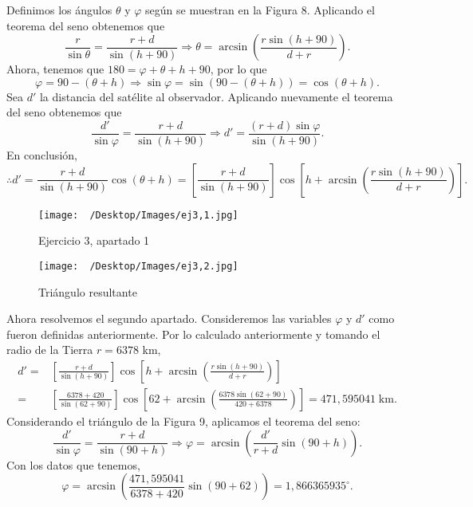 \documentclass{article}
\begin{document}
\begin{sol}
	Definimos los ángulos $\displaystyle \theta $ y $\displaystyle \varphi $ según se muestran en la Figura 8. Aplicando el teorema del seno obtenemos que
\[ \frac{r}{\sin \theta } = \frac{r + d}{\sin\left(h + 90\right)} \Rightarrow \theta = \arcsin\left(\frac{r\sin\left(h+90\right)}{d + r}\right) .\]
Ahora, tenemos que $\displaystyle 180 = \varphi + \theta + h + 90 $, por lo que
\[\varphi = 90 - \left(\theta + h\right) \Rightarrow \sin\varphi = \sin\left(90-\left(\theta + h\right)\right) = \cos \left(\theta + h\right) .\]
Sea $\displaystyle d' $ la distancia del satélite al observador. Aplicando nuevamente el teorema del seno obtenemos que
\[ \frac{d'}{\sin\varphi} = \frac{r + d}{\sin\left(h+90\right)} \Rightarrow d' = \frac{\left(r+d\right)\sin\varphi}{\sin\left(h+90\right)} .\]
En conclusión,
\[\therefore d' = \frac{r+d}{\sin\left(h+90\right)}\cos\left(\theta + h\right) = \left[\frac{r + d}{\sin\left(h+90\right)}\right] \cos\left[h + \arcsin\left(\frac{r \sin\left(h+90\right)}{d + r}\right)\right] .\]
\begin{figure}
	\centering
	\texttt{[image: ~/Desktop/Images/ej3,1.jpg]}
	\caption{Ejercicio 3, apartado 1}
	\label{}
	\end{figure}
	\begin{figure}
	\centering
	\texttt{[image: ~/Desktop/Images/ej3,2.jpg]}
	\caption{Triángulo resultante}
	\label{}
	\end{figure}
Ahora resolvemos el segundo apartado. Consideremos las variables $\displaystyle \varphi $ y $\displaystyle d' $ como fueron definidas anteriormente. Por lo calculado anteriormente y tomando el radio de la Tierra $\displaystyle r = 6378 $ km,
\[
\begin{split}
	d' = & \left[\frac{r + d}{\sin\left(h+90\right)}\right] \cos\left[h + \arcsin\left(\frac{r \sin\left(h+90\right)}{d + r}\right)\right] \\
	= & \left[\frac{6378 + 420}{\sin\left(62 + 90\right)}\right] \cos\left[62+ \arcsin\left(\frac{6378 \sin\left(62 + 90\right)}{420 + 6378}\right)\right] = 471,595041 \; \text{km} .
\end{split}
\]
Considerando el triángulo de la Figura 9, aplicamos el teorema del seno:
\[ \frac{d'}{\sin\varphi} = \frac{r + d}{\sin\left(90 + h\right)} \Rightarrow \varphi = \arcsin\left(\frac{d'}{r + d}\sin\left(90+h\right)\right) .\]
Con los datos que tenemos,
\[\varphi = \arcsin\left(\frac{471,595041}{6378 + 420}\sin\left(90+62\right)\right) = 1,866365935^{\circ}.\]

\end{sol}
\end{document}
